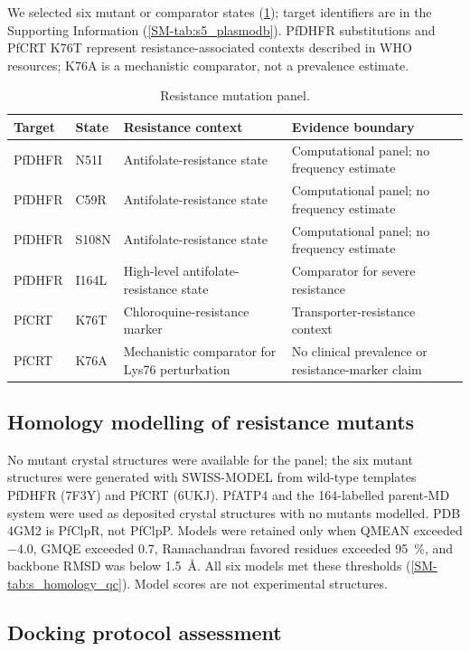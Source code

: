 \documentclass[11pt,a4paper]{article}
\begin{document}
We selected six mutant or comparator states (\cref{tab:mutations}); target identifiers are in the Supporting Information (\cref{SM-tab:s5_plasmodb}). PfDHFR substitutions and PfCRT K76T represent resistance-associated contexts described in WHO resources; K76A is a mechanistic comparator, not a prevalence estimate.

\begin{table}[htbp]
\centering
\caption{Resistance mutation panel.}
\label{tab:mutations}
\begin{tabularx}{\textwidth}{l l l X}
\toprule
Target & State & Resistance context & Evidence boundary \\
\midrule
PfDHFR & N51I & Antifolate-resistance state & Computational panel; no frequency estimate \\
PfDHFR & C59R & Antifolate-resistance state & Computational panel; no frequency estimate \\
PfDHFR & S108N & Antifolate-resistance state & Computational panel; no frequency estimate \\
PfDHFR & I164L & High-level antifolate-resistance state & Comparator for severe resistance \\
PfCRT & K76T & Chloroquine-resistance marker & Transporter-resistance context \\
PfCRT & K76A & Mechanistic comparator for Lys76 perturbation & No clinical prevalence or resistance-marker claim \\
\bottomrule
\end{tabularx}
\end{table}

\subsection{Homology modelling of resistance mutants}

No mutant crystal structures were available for the panel; the six mutant structures were generated with SWISS-MODEL from wild-type templates PfDHFR (7F3Y) and PfCRT (6UKJ). PfATP4 and the 164-labelled parent-MD system were used as deposited crystal structures with no mutants modelled. PDB 4GM2 is PfClpR, not PfClpP. Models were retained only when QMEAN exceeded \num{-4.0}, GMQE exceeded \num{0.7}, Ramachandran favored residues exceeded \qty{95}{\percent}, and backbone RMSD was below \qty{1.5}{\angstrom}. All six models met these thresholds (\cref{SM-tab:s_homology_qc}). Model scores are not experimental structures.

\subsection{Docking protocol assessment}
\end{document}
